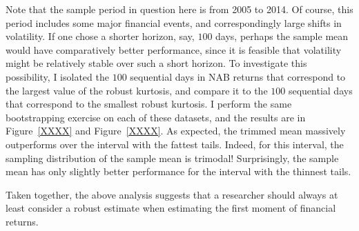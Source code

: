 \documentclass[12pt,a4paper]{amsart}
\begin{document}
Note that the sample period in question here is from 2005 to 2014. Of course, this period includes some major financial events, and correspondingly large shifts in volatility. If one chose a shorter horizon, say, $100$ days, perhaps the sample mean would have comparatively better performance, since it is feasible that volatility might be relatively stable over such a short horizon. To investigate this possibility, I isolated the $100$ sequential days in NAB returns that correspond to the largest value of the robust kurtosis, and compare it to the $100$ sequential days that correspond to the smallest robust kurtosis. I perform the same bootstrapping exercise on each of these datasets, and the results are in Figure~\ref{XXXX} and Figure~\ref{XXXX}. As expected, the trimmed mean massively outperforms over the interval with the fattest tails. Indeed, for this interval, the sampling distribution of the sample mean is trimodal! Surprisingly, the sample mean has only slightly better performance for the interval with the thinnest tails.

Taken together, the above analysis suggests that a researcher should always at least consider a robust estimate when estimating the first moment of financial returns.

 



%
%
%
\end{document}

